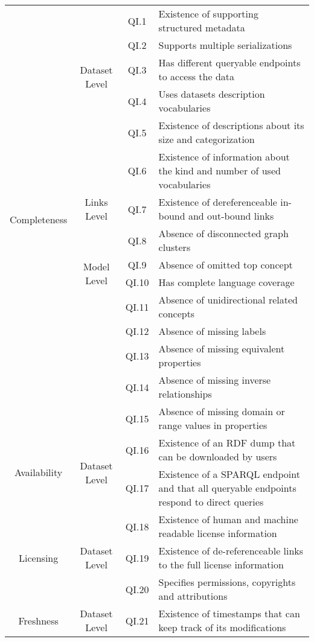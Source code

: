\documentclass[onecolumn, crcready]{iosart2c}
\begin{document}
\begin{center}
{\begin{longtable}[h]{|c|c|c|l|}
\multirow{15}{*}{Completeness}
 & \multirow{5}{*}{Dataset Level} & QI.1 & Existence of supporting structured metadata  \cite{Hogan2010}\tabularnewline
\cline{3-4}
 &  & QI.2 & Supports multiple serializations \cite{Framework2012}\tabularnewline
\cline{3-4}
 &  & QI.3 & Has different queryable endpoints to access the data \cite{Framework2012}\tabularnewline
\cline{3-4}
 &  & QI.4 & Uses datasets description vocabularies \tabularnewline
\cline{3-4}
 &  & QI.5 & Existence of descriptions about its size and categorization \tabularnewline
 \cline{3-4}
 &  & QI.6 & Existence of information about the kind and number of used vocabularies \cite{Framework2012}\tabularnewline
\cline{2-4}
 & \multirow{1}{*}{Links Level} & QI.7 & Existence of dereferenceable in-bound and out-bound links \cite{Hogan2010}\cite{Mader2012}\cite{Gueret2012}\tabularnewline
\cline{2-4}
 & \multirow{4}{*}{Model Level} & QI.8 & Absence of disconnected graph clusters \cite{Mader2012}\tabularnewline
\cline{3-4}
 &  & QI.9 & Absence of omitted top concept \cite{Hogan2010}\tabularnewline
 \cline{3-4}
 &  & QI.10 & Has complete language coverage \cite{Mader2012}\tabularnewline
\cline{3-4}
 &  & QI.11 & Absence of unidirectional related concepts \cite{Hogan2010}\tabularnewline
 \cline{3-4}
 &  & QI.12 & Absence of missing labels \cite{Mader2012}\tabularnewline
 \cline{3-4}
 &  & QI.13 & Absence of missing equivalent properties \cite{DBLP:conf/ic3k/KeetSP13}\tabularnewline
 \cline{3-4}
 &  & QI.14 & Absence of missing inverse relationships \cite{DBLP:conf/ic3k/KeetSP13}\tabularnewline
 \cline{3-4}
 &  & QI.15 & Absence of missing domain or range values in properties \cite{DBLP:conf/ic3k/KeetSP13}\tabularnewline
\hline
\hline
\multirow{2}{*}{Availability} & \multirow{2}{*}{Dataset Level} & QI.16 & Existence of an RDF dump that can be downloaded by users \cite{flemming2010}\cite{Hogan2010}\tabularnewline
\cline{3-4}
 &  & QI.17 & Existence of a SPARQL endpoint and that all queryable endpoints respond to direct queries \tabularnewline
\hline
\hline
\multirow{3}{*}{Licensing} & \multirow{3}{*}{Dataset Level} & QI.18 & Existence of human and machine readable license information \cite{Hogan:2012:ESL:2263498.2264570}\tabularnewline
\cline{3-4}
 &  & QI.19 & Existence of de-referenceable links to the full license information  \cite{Hogan:2012:ESL:2263498.2264570}\tabularnewline
\cline{3-4}
 &  & QI.20 & Specifies permissions, copyrights and attributions  \cite{Framework2012}\tabularnewline
\hline
\hline
\multirow{1}{*}{Freshness} & \multirow{1}{*}{Dataset Level} & QI.21 & Existence of timestamps that can keep track of its modifications  \cite{Flouris2012}\tabularnewline

\end{longtable}}
\end{center}
\end{document}

